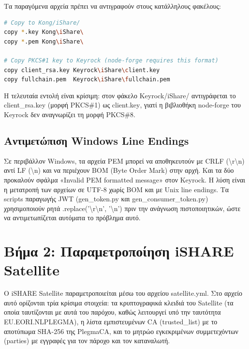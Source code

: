 Τα παραγόμενα αρχεία πρέπει να αντιγραφούν στους κατάλληλους φακέλους:

\begin{lstlisting}[language=bash, caption={Copying certificates to component directories.}]
# Copy to Kong/iShare/
copy *.key Kong\iShare\
copy *.pem Kong\iShare\

# Copy PKCS#1 key to Keyrock (node-forge requires this format)
copy client_rsa.key Keyrock\iShare\client.key
copy fullchain.pem  Keyrock\iShare\fullchain.pem
\end{lstlisting}

Η τελευταία εντολή είναι κρίσιμη: στον φάκελο \textlatin{Keyrock/iShare/}
αντιγράφεται το \textlatin{client\_rsa.key} (μορφή \textlatin{PKCS\#1})
ως \textlatin{client.key}, γιατί η βιβλιοθήκη \textlatin{node-forge}
του \textlatin{Keyrock} δεν αναγνωρίζει τη μορφή \textlatin{PKCS\#8}.

\subsection{Αντιμετώπιση \textlatin{Windows Line Endings}}
\label{subsec:line-endings}

Σε περιβάλλον \textlatin{Windows}, τα αρχεία \textlatin{PEM} μπορεί
να αποθηκευτούν με \textlatin{CRLF} (\textlatin{\textbackslash r\textbackslash n})
αντί \textlatin{LF} (\textlatin{\textbackslash n}) και να περιέχουν
\textlatin{BOM} (\textlatin{Byte Order Mark}) στην αρχή. Και τα
δύο προκαλούν σφάλμα \textlatin{«Invalid PEM formatted message»}
στον \textlatin{Keyrock}. Η λύση είναι η μετατροπή των αρχείων σε
\textlatin{UTF-8} χωρίς \textlatin{BOM} και με \textlatin{Unix line
endings}. Τα \textlatin{scripts} παραγωγής \textlatin{JWT}
(\textlatin{gen\_token.py} και \textlatin{gen\_consumer\_token.py})
χρησιμοποιούν ρητά
\textlatin{.replace('\textbackslash r\textbackslash n',
'\textbackslash n')} πριν την ανάγνωση πιστοποιητικών, ώστε
να αντιμετωπίζεται αυτόματα το πρόβλημα αυτό.

\section{Βήμα 2: Παραμετροποίηση \textlatin{iSHARE Satellite}}
\label{sec:step2-satellite}

Ο \textlatin{iSHARE Satellite} παραμετροποιείται μέσω του αρχείου
\textlatin{satellite.yml}. Στο αρχείο αυτό ορίζονται τρία κρίσιμα
στοιχεία: τα κρυπτογραφικά κλειδιά του \textlatin{Satellite} (τα
οποία ταυτίζονται με αυτά του παρόχου, καθώς λειτουργεί υπό την
ταυτότητα \textlatin{EU.EORI.NLPLEGMA}), η λίστα εμπιστευμένων
\textlatin{CA} (\textlatin{trusted\_list}) με το αποτύπωμα
\textlatin{SHA-256} της \textlatin{PlegmaCA}, και το μητρώο
εγκεκριμένων συμμετεχόντων (\textlatin{parties}) με εγγραφές για
τον πάροχο και τον καταναλωτή.

